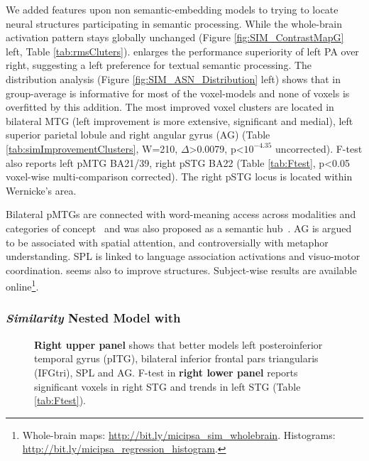 We added  features upon non semantic-embedding models to trying to locate neural structures participating in semantic \similarity processing. While the whole-brain activation pattern stays globally unchanged (Figure \ref{fig:SIM_ContrastMapG} left, Table \ref{tab:rmsCluters}).  enlarges the performance superiority of left PA over right, suggesting a left preference for textual semantic \similarity processing. The  distribution analysis (Figure \ref{fig:SIM_ASN_Distribution} left) shows that in group-average  is informative for most of the voxel-models and none of voxels is overfitted by this addition. The most improved voxel clusters are located in bilateral MTG (left improvement is more extensive, significant and medial), left superior parietal lobule and right angular gyrus (AG) (Table \ref{tab:simImprovementClusters}, W=210, \(\Delta\)>0.0079, p<\(10^{-4.35}\) uncorrected). F-test also reports left pMTG BA21/39, right pSTG BA22 (Table \ref{tab:Ftest}, p<0.05 voxel-wise multi-comparison corrected). The right pSTG locus is located within Wernicke's area. 

Bilateral pMTGs are connected with word-meaning access across modalities and categories of concept~\parencite{visserBothMiddleTemporal2012} and was also proposed as a semantic hub~\parencite{turkenNeuralArchitectureLanguage2011}. AG is argued to be associated with spatial attention, and controversially with metaphor understanding. SPL is linked to language association activations and visuo-motor coordination.  seems also to improve \association structures. Subject-wise results are available online\footnote{Whole-brain maps: \url{http://bit.ly/micipsa_sim_wholebrain}. Histograms: \url{http://bit.ly/micipsa_regression_histogram}.}.

\subsubsection{\emph{Similarity} Nested Model with }

\begin{figure}
    \centering
        \caption[Encoding with  Features, Group]{\textbf{Right upper panel} shows that  better models left posteroinferior temporal gyrus (pITG), bilateral inferior frontal pars triangularis (IFGtri), SPL and AG. F-test in \textbf{right lower panel} reports significant voxels in right STG and trends in left STG (Table \ref{tab:Ftest}).} 
        \label{fig:SIG_ContrastMapG}
    \end{figure}
    

